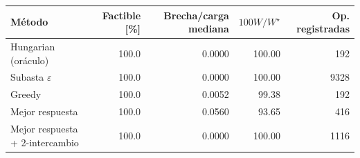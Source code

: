 \begin{tabular}{lrrrr}
\toprule
Método & Factible [\%] & Brecha/carga mediana & $100W/W^\star$ & Op. registradas \\
\midrule
Hungarian (oráculo) & 100.0 & 0.0000 & 100.00 & 192 \\
Subasta $\varepsilon$ & 100.0 & 0.0000 & 100.00 & 9328 \\
Greedy & 100.0 & 0.0052 & 99.38 & 192 \\
Mejor respuesta & 100.0 & 0.0560 & 93.65 & 416 \\
Mejor respuesta + 2-intercambio & 100.0 & 0.0000 & 100.00 & 1116 \\
\bottomrule
\end{tabular}
